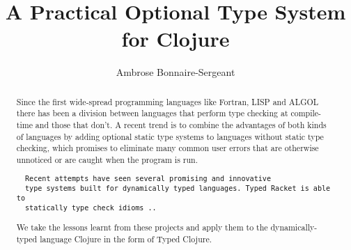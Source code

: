 \documentclass{cshonours}
\title{A Practical Optional Type System for Clojure}
\author{Ambrose Bonnaire-Sergeant}
\begin{document}
\maketitle

\begin{abstract}
  Since the first wide-spread programming languages like Fortran, LISP and ALGOL
  there has been a division between languages that perform type checking at compile-time
  and those that don't.
  A recent trend is to combine the advantages of both kinds of languages by adding optional
  static type systems to languages without static type checking,
  which promises to eliminate many common user errors
  that are otherwise unnoticed or are caught when the program is run. 

\begin{verbatim}
  Recent attempts have seen several promising and innovative
  type systems built for dynamically typed languages. Typed Racket is able to
  statically type check idioms ..
\end{verbatim}
  We take the lessons learnt from these
  projects and apply them to the dynamically-typed language Clojure in the form of Typed Clojure.
\end{abstract}















%
%

%


\printbibliography[title=References]
\end{document}
